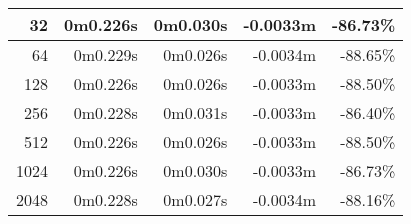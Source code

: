 \documentclass[documentation.tex]{subfiles}
\begin{document}
\begin{longtable}{|r|r|r|r|r|}
        32                                                                                                                        & 0m0.226s                        & 0m0.030s                                                                       & {\color[HTML]{FF0000} -0.0033m}                       & {\color[HTML]{FF0000} -86.73\%}                        \\ \hline
        64                                                                                                                        & 0m0.229s                        & 0m0.026s                                                                       & {\color[HTML]{FF0000} -0.0034m}                       & {\color[HTML]{FF0000} -88.65\%}                        \\ \hline
        128                                                                                                                       & 0m0.226s                        & 0m0.026s                                                                       & {\color[HTML]{FF0000} -0.0033m}                       & {\color[HTML]{FF0000} -88.50\%}                        \\ \hline
        256                                                                                                                       & 0m0.228s                        & 0m0.031s                                                                       & {\color[HTML]{FF0000} -0.0033m}                       & {\color[HTML]{FF0000} -86.40\%}                        \\ \hline
        512                                                                                                                       & 0m0.226s                        & 0m0.026s                                                                       & {\color[HTML]{FF0000} -0.0033m}                       & {\color[HTML]{FF0000} -88.50\%}                        \\ \hline
        1024                                                                                                                      & 0m0.226s                        & 0m0.030s                                                                       & {\color[HTML]{FF0000} -0.0033m}                       & {\color[HTML]{FF0000} -86.73\%}                        \\ \hline
        2048                                                                                                                      & 0m0.228s                        & 0m0.027s                                                                       & {\color[HTML]{FF0000} -0.0034m}                       & {\color[HTML]{FF0000} -88.16\%}                        \\ \hline

\end{longtable}
\end{document}
